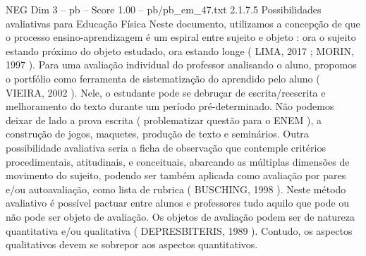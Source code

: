 \begin{textsample}{NEG Dim 3 – pb – Score 1.00 – pb/pb\_em\_47.txt}  \label{ex:f3_neg_209}
2.1.7.5 Possibilidades avaliativas para Educação Física Neste documento, utilizamos a concepção de que o processo ensino-aprendizagem é um espiral entre sujeito e objeto : ora o sujeito estando próximo do objeto estudado, ora estando longe ( LIMA, 2017 ; MORIN, 1997 ).
Para uma avaliação individual do professor analisando o aluno, propomos o portfólio como ferramenta de sistematização do aprendido pelo aluno ( VIEIRA, 2002 ).
Nele, o estudante pode se debruçar de escrita/reescrita e melhoramento do texto durante um período pré-determinado.
Não podemos deixar de lado a prova escrita ( problematizar questão para o ENEM ), a construção de jogos, maquetes, produção de texto e seminários.
Outra possibilidade avaliativa seria a ficha de observação que contemple critérios procedimentais, atitudinais, e conceituais, abarcando as múltiplas dimensões de movimento do sujeito, podendo ser também aplicada como avaliação por pares e/ou autoavaliação, como lista de rubrica ( BUSCHING, 1998 ).
Neste método avaliativo é possível pactuar entre alunos e professores tudo aquilo que pode ou não pode ser objeto de avaliação.
Os objetos de avaliação podem ser de natureza quantitativa e/ou qualitativa ( DEPRESBITERIS, 1989 ).
Contudo, os aspectos qualitativos devem se sobrepor aos aspectos quantitativos.

\end{textsample}
